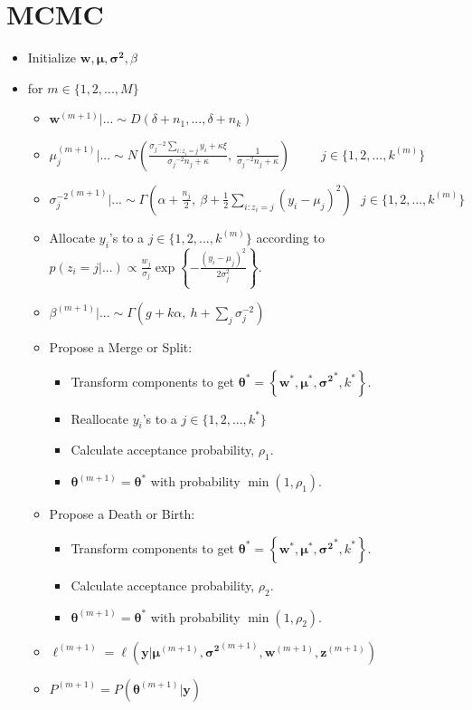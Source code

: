 \documentclass{article}
\begin{document}
\section{MCMC}
\begin{itemize}
\item Initialize $\bm{w}, \bm{\mu}, \bm{\sigma^2}, \beta$
\item for $m\in\{1,2,...,M\}$
	\begin{itemize}
	\item $\bm{w}^{(m+1)}|... \sim D(\delta+n_1, ..., \delta+n_k)$
	\item $\mu_j^{(m+1)}|... \sim N\left( \frac{ {\sigma_j}^{-2} \sum\limits_{i:z_i = j} y_i +\kappa \xi }{ {\sigma_j}^{-2}n_j + \kappa },~ \frac{1}{{\sigma_j}^{-2}n_j + \kappa}\right) ~~~~~~~~~~~ j\in\{1,2,...,k^{(m)}\}$
	\item ${\sigma^{-2}_j}^{(m+1)}|... \sim \Gamma\left( \alpha+\frac{n_j}{2},~ \beta+\frac{1}{2}\sum\limits_{i:z_i = j}(y_i-\mu_j)^2 \right) ~~~ j\in\{1,2,...,k^{(m)}\}$
	\item Allocate $y_i$'s to a $j\in\{1,2,...,k^{(m)}\}$ according to $p(z_i=j|...) \propto \frac{w_j}{\sigma_j}\exp\left\{ -\frac{(y_i-\mu_j)^2}{2\sigma_j^2} \right\}$.
	\item ${\beta}^{(m+1)}|... \sim \Gamma\left( g+k\alpha,~h+\sum\limits_{j} \sigma_j^{-2} \right)$
	\item Propose a Merge or Split:
		\begin{itemize}
		\item Transform components to get $\bm{\theta}^*=\left\{\bm{w}^*, \bm{\mu}^*, {\bm{\sigma^2}}^*, k^*\right\}$.
		\item Reallocate $y_i$'s to a $j\in\{1,2,...,k^*\}$
		\item Calculate acceptance probability, $\rho_1$.
		\item $\bm{\theta}^{(m+1)}=\bm{\theta}^*$ with probability $\min(1, \rho_1)$. 	
		\end{itemize}
	\item Propose a Death or Birth:
		\begin{itemize}
		\item Transform components to get $\bm{\theta}^*=\left\{\bm{w}^*, \bm{\mu}^*, {\bm{\sigma^2}}^*, k^*\right\}$.
		\item Calculate acceptance probability, $\rho_2$.
		\item $\bm{\theta}^{(m+1)}=\bm{\theta}^*$ with probability $\min(1, \rho_2)$. 	
		\end{itemize}
	\item $\ell^{(m+1)} = \ell(\bm{y}|\bm{\mu}^{(m+1)},{\bm{\sigma^2}}^{(m+1)}, \bm{w}^{(m+1)}, \bm{z}^{(m+1)})$
	\item $P^{(m+1)} = P(\bm{\theta}^{(m+1)}|\bm{y})$
	\end{itemize} 
\end{itemize}
\end{document}
